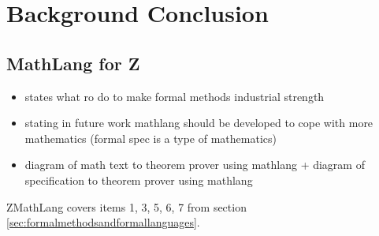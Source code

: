 
\section{Background Conclusion}

\subsection{MathLang for Z}


\begin{itemize}
\item \cite{fmpresetation} states what ro do to make formal methods industrial strength

\item \cite{lamarphd} stating in future work mathlang should be developed to cope with more mathematics (formal spec is a type of mathematics)

\item diagram of math text to theorem prover using mathlang + diagram of specification to theorem prover using mathlang
\end{itemize}

ZMathLang covers items 1, 3, 5, 6, 7 from section \ref{sec:formalmethodsandformallanguages}.